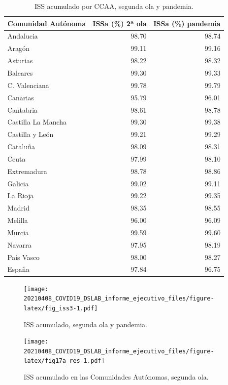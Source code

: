 \documentclass[
  11pt,
]{article}
\begin{document}
\begin{table}[!h]

\caption{\label{tab:tabla}ISS acumulado por CCAA, segunda ola y pandemia.}
\centering
\fontsize{9}{11}\selectfont
\begin{tabular}[t]{l|r|r}
\hline
Comunidad Autónoma & ISSa (\%) 2ª ola & ISSa (\%) pandemia\\
\hline
Andalucia & 98.70 & 98.74\\
\hline
Aragón & 99.11 & 99.16\\
\hline
Asturias & 98.22 & 98.32\\
\hline
Baleares & 99.30 & 99.33\\
\hline
C. Valenciana & 99.78 & 99.79\\
\hline
Canarias & 95.79 & 96.01\\
\hline
Cantabria & 98.61 & 98.78\\
\hline
Castilla La Mancha & 99.30 & 99.38\\
\hline
Castilla y León & 99.21 & 99.29\\
\hline
Cataluña & 98.09 & 98.31\\
\hline
Ceuta & 97.99 & 98.10\\
\hline
Extremadura & 98.78 & 98.86\\
\hline
Galicia & 99.02 & 99.11\\
\hline
La Rioja & 99.22 & 99.35\\
\hline
Madrid & 98.35 & 98.55\\
\hline
Melilla & 96.00 & 96.09\\
\hline
Murcia & 99.59 & 99.60\\
\hline
Navarra & 97.95 & 98.19\\
\hline
País Vasco & 98.00 & 98.27\\
\hline
España & 97.84 & 96.75\\
\hline
\end{tabular}
\end{table}

\begin{figure}
\centering
\texttt{[image: 20210408\_COVID19\_DSLAB\_informe\_ejecutivo\_files/figure-latex/fig\_iss3-1.pdf]}
\caption{\label{fig:fig_iss3} ISS acumulado, segunda ola y pandemia.}
\end{figure}

\vspace{0.2cm}

\begin{figure}
\centering
\texttt{[image: 20210408\_COVID19\_DSLAB\_informe\_ejecutivo\_files/figure-latex/fig17a\_res-1.pdf]}
\caption{\label{fig:fig17a_res} ISS acumulado en las Comunidades
Autónomas, segunda ola.}
\end{figure}
\end{document}
